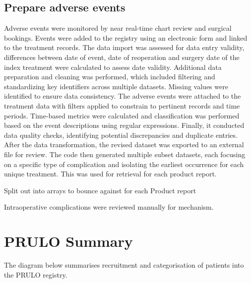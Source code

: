 \documentclass[
]{article}
\begin{document}
\subsection{Prepare adverse events}\label{prepare-adverse-events}

Adverse events were monitored by near real-time chart review and
surgical bookings. Events were added to the registry using an electronic
form and linked to the treatment records. The data import was assessed
for data entry validity, differences between date of event, date of
reoperation and surgery date of the index treatment were calculated to
assess date validity. Additional data preparation and cleaning was
performed, which included filtering and standardizing key identifiers
across multiple datasets. Missing values were identified to ensure data
consistency. The adverse events were attached to the treatment data with
filters applied to constrain to pertinent records and time periods.
Time-based metrics were calculated and classification was performed
based on the event descriptions using regular expressions. Finally, it
conducted data quality checks, identifying potential discrepancies and
duplicate entries. After the data transformation, the revised dataset
was exported to an external file for review. The code then generated
multiple subset datasets, each focusing on a specific type of
complication and isolating the earliest occurrence for each unique
treatment. This was used for retrieval for each product report.

Split out into arrays to bounce against for each Product report

Intraoperative complications were reviewed manually for mechanism.

\section{PRULO Summary}\label{prulo-summary}

The diagram below summarises recruitment and categorisation of patients
into the PRULO registry.
\end{document}
